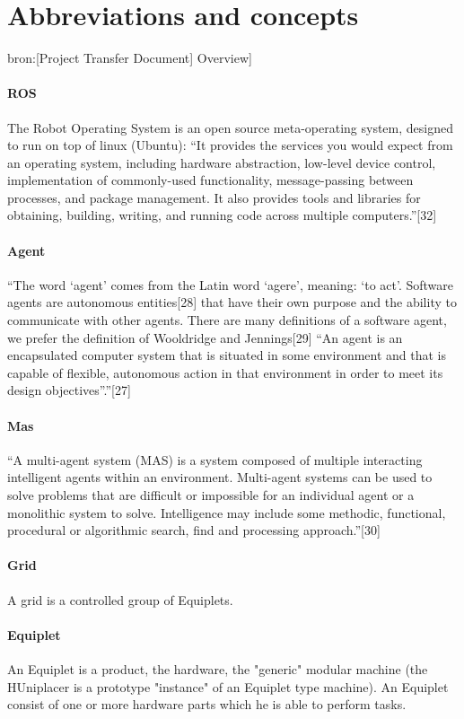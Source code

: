 \documentclass[12pt,a4paper]{report}
\begin{document}
\chapter{Abbreviations and concepts}
bron:[Project Transfer Document] Overview]
\subsubsection{ROS}
The Robot Operating System is an open source meta-operating system, designed to run on top of linux (Ubuntu): “It provides the services you would expect from an operating system, including hardware abstraction, low-level device control, implementation of commonly-used functionality, message-passing between processes, and package management. It also provides tools and libraries for obtaining, building, writing, and running code across multiple computers.”[32]
\subsubsection{Agent}
“The word ‘agent’ comes from the Latin word ‘agere’, meaning: ‘to act’. Software agents are autonomous entities[28] that have their own purpose and the ability to communicate with other agents. There are many definitions of a software agent, we prefer the definition of Wooldridge and Jennings[29] “An agent is an encapsulated computer system that is situated in some environment and that is capable of flexible, autonomous action in that environment in
order to meet its design objectives”.”[27]
\subsubsection{Mas}
“A multi-agent system (MAS) is a system composed of multiple interacting intelligent agents within an environment. Multi-agent systems can be used to solve problems that are difficult or impossible for an individual agent or a monolithic system to solve. Intelligence may include some methodic, functional, procedural or algorithmic search, find and processing approach.”[30]
\subsubsection{Grid}
A grid is a controlled group of Equiplets.
\subsubsection{Equiplet}
An Equiplet is a product, the hardware, the "generic" modular machine (the HUniplacer is a prototype "instance" of an Equiplet type machine). An Equiplet consist of one or more hardware parts which he is able to perform tasks.
\end{document}
